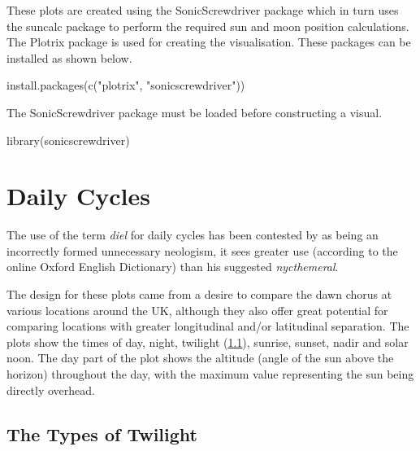 \documentclass[
]{book}
\newenvironment{Shaded}{\begin{snugshade}}{\end{snugshade}}
\newcommand{\FunctionTok}[1]{\textcolor[rgb]{0.00,0.00,0.00}{#1}}
\newcommand{\NormalTok}[1]{#1}
\newcommand{\StringTok}[1]{\textcolor[rgb]{0.31,0.60,0.02}{#1}}
\begin{document}
These plots are created using the SonicScrewdriver package \citep{sonicscrewdriver} which in turn uses the suncalc package \citep{suncalc} to perform the required sun and moon position calculations. The Plotrix package \citep{plotrix} is used for creating the visualisation. These packages can be installed as shown below.

\begin{Shaded}
\begin{Highlighting}[]
\FunctionTok{install.packages}\NormalTok{(}\FunctionTok{c}\NormalTok{(}\StringTok{"plotrix"}\NormalTok{, }\StringTok{"sonicscrewdriver"}\NormalTok{))}
\end{Highlighting}
\end{Shaded}

The SonicScrewdriver package must be loaded before constructing a visual.

\begin{Shaded}
\begin{Highlighting}[]
\FunctionTok{library}\NormalTok{(sonicscrewdriver)}
\end{Highlighting}
\end{Shaded}

\hypertarget{daily-cycles}{%
\section{Daily Cycles}\label{daily-cycles}}

The use of the term \emph{diel} for daily cycles has been contested by \citet{broughton1963} as being an incorrectly formed unnecessary neologism, it sees greater use (according to the online Oxford English Dictionary) than his suggested \emph{nycthemeral}.

The design for these plots came from a desire to compare the dawn chorus at various locations around the UK, although they also offer great potential for comparing locations with greater longitudinal and/or latitudinal separation. The plots show the times of day, night, twilight (\ref{twilight-types}), sunrise, sunset, nadir and solar noon. The day part of the plot shows the altitude (angle of the sun above the horizon) throughout the day, with the maximum value representing the sun being directly overhead.

\hypertarget{twilight-types}{%
\subsection{The Types of Twilight}\label{twilight-types}}
\end{document}
